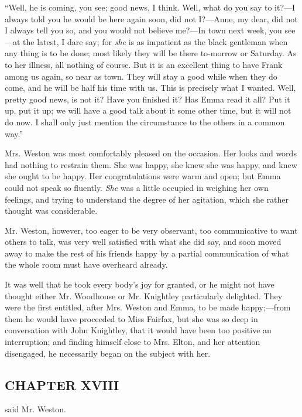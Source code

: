“Well, he is coming, you see; good news, I think. Well, what do you say to it?---I always told you he would be here again soon, did not I?---Anne, my dear, did not I always tell you so, and you would not believe me?---In town next week, you see---at the latest, I dare say; for {\em she} is as impatient as the black gentleman when any thing is to be done; most likely they will be there to-morrow or Saturday. As to her illness, all nothing of course. But it is an excellent thing to have Frank among us again, so near as town. They will stay a good while when they do come, and he will be half his time with us. This is precisely what I wanted. Well, pretty good news, is not it? Have you finished it? Has Emma read it all? Put it up, put it up; we will have a good talk about it some other time, but it will not do now. I shall only just mention the circumstance to the others in a common way.”

Mrs. Weston was most comfortably pleased on the occasion. Her looks and words had nothing to restrain them. She was happy, she knew she was happy, and knew she ought to be happy. Her congratulations were warm and open; but Emma could not speak so fluently. {\em She} was a little occupied in weighing her own feelings, and trying to understand the degree of her agitation, which she rather thought was considerable.

Mr. Weston, however, too eager to be very observant, too communicative to want others to talk, was very well satisfied with what she did say, and soon moved away to make the rest of his friends happy by a partial communication of what the whole room must have overheard already.

It was well that he took every body's joy for granted, or he might not have thought either Mr. Woodhouse or Mr. Knightley particularly delighted. They were the first entitled, after Mrs. Weston and Emma, to be made happy;---from them he would have proceeded to Miss Fairfax, but she was so deep in conversation with John Knightley, that it would have been too positive an interruption; and finding himself close to Mrs. Elton, and her attention disengaged, he necessarily began on the subject with her.

\subsection[chapter-xviii-1]{\useURL[url37][][][]\from[url37]CHAPTER XVIII}

 said Mr. Weston.

